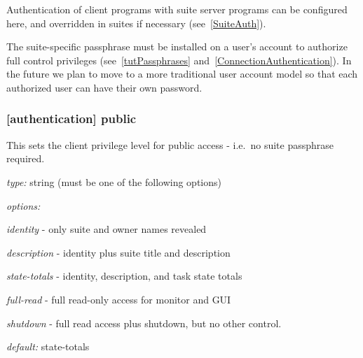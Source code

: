 Authentication of client programs with suite server programs can be configured
here, and overridden in suites if necessary (see~\ref{SuiteAuth}).

The suite-specific passphrase must be installed on a user's account to
authorize full control privileges (see~\ref{tutPassphrases}
and~\ref{ConnectionAuthentication}). In the future we plan to move to a more
traditional user account model so that each authorized user can have their own
password.

\subsubsection[public]{[authentication] \textrightarrow public}

This sets the client privilege level for public access - i.e.\ no suite passphrase
required.

\begin{myitemize}
\item {\em type:} string (must be one of the following options)
\item {\em options:}
    \begin{myitemize}
        \item {\em identity} - only suite and owner names revealed
        \item {\em description} - identity plus suite title and description
        \item {\em state-totals} - identity, description, and task state totals
        \item {\em full-read} - full read-only access for monitor and GUI
        \item {\em shutdown} - full read access plus shutdown, but no other
            control.
    \end{myitemize}
\item {\em default:} state-totals
\end{myitemize}
